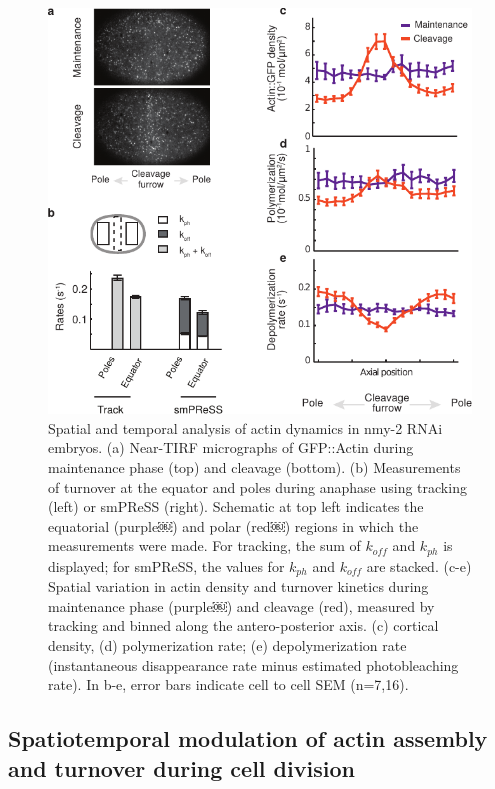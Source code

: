 \begin{figure}[h!]
 	\centering
 	\includegraphics[width=0.8\hsize]{nmeth/Fig4}
 	\caption{\label{fig:fig4} Spatial and temporal analysis of actin dynamics in nmy-2 RNAi embryos. (a) Near-TIRF micrographs of GFP::Actin during maintenance phase (top) and cleavage (bottom). (b) Measurements of turnover at the equator and poles during anaphase using tracking (left) or smPReSS (right). Schematic at top left indicates the equatorial (purple￼) and polar (red￼) regions in which the measurements were made. For tracking, the sum of $k_{off}$ and $k_{ph}$ is displayed; for smPReSS, the values for $k_{ph}$ and $k_{off}$ are stacked. (c-e) Spatial variation in actin density and turnover kinetics during maintenance phase (purple￼) and cleavage (red), measured by tracking and binned along the antero-posterior axis. (c) cortical density, (d) polymerization rate; (e) depolymerization rate (instantaneous disappearance rate minus estimated photobleaching rate). In b-e, error bars indicate cell to cell SEM (n=7,16). }
 \end{figure}
 
 
 
 \subsection{Spatiotemporal modulation of actin assembly and turnover during cell division}
 
